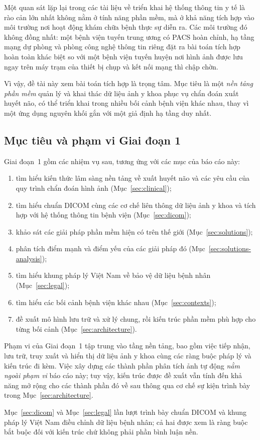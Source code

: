 Một quan sát lặp lại trong các tài liệu về triển khai hệ thống thông tin y tế là
rào cản lớn nhất không nằm ở tính năng phần mềm, mà ở khả năng tích hợp vào môi
trường nơi hoạt động khám chữa bệnh thực sự diễn ra. Các môi trường đó không đồng
nhất: một bệnh viện tuyến trung ương có PACS hoàn chỉnh, hạ tầng mạng dự phòng
và phòng công nghệ thông tin riêng đặt ra bài toán tích hợp hoàn toàn khác biệt so
với một bệnh viện tuyến huyện nơi hình ảnh được lưu ngay trên máy trạm của thiết
bị chụp và kết nối mạng thì chập chờn.

Vì vậy, đề tài này xem bài toán tích hợp là trọng tâm. Mục tiêu là một
\emph{nền tảng phần mềm} quản lý và khai thác dữ liệu ảnh y khoa phục vụ chẩn
đoán xuất huyết não, có thể triển khai trong nhiều bối cảnh bệnh viện khác nhau,
thay vì một ứng dụng nguyên khối gắn với một giả định hạ tầng duy nhất.

\subsection{Mục tiêu và phạm vi Giai đoạn 1}

Giai đoạn~1 gồm các nhiệm vụ sau, tương ứng với các mục của báo cáo này:

\begin{enumerate}[label=(\alph*)]
    \item tìm hiểu kiến thức lâm sàng nền tảng về xuất huyết não và các yêu cầu
          của quy trình chẩn đoán hình ảnh (Mục~\ref{sec:clinical});
    \item tìm hiểu chuẩn DICOM cùng các cơ chế liên thông dữ liệu ảnh y khoa
      và tích hợp với hệ thống thông tin bệnh viện
          (Mục~\ref{sec:dicom});
    \item khảo sát các giải pháp phần mềm hiện có trên thế giới
          (Mục~\ref{sec:solutions});
    \item phân tích điểm mạnh và điểm yếu của các giải pháp đó
          (Mục~\ref{sec:solutions-analysis});
    \item tìm hiểu khung pháp lý Việt Nam về bảo vệ dữ liệu bệnh nhân
          (Mục~\ref{sec:legal});
    \item tìm hiểu các bối cảnh bệnh viện khác nhau
          (Mục~\ref{sec:contexts});
    \item đề xuất mô hình lưu trữ và xử lý chung, rồi kiến trúc phần mềm phù hợp
      cho từng bối cảnh
          (Mục~\ref{sec:architecture}).
\end{enumerate}

Phạm vi của Giai đoạn~1 tập trung vào tầng nền tảng, bao gồm việc tiếp nhận, lưu
trữ, truy xuất và hiển thị dữ liệu ảnh y khoa cùng các ràng buộc pháp lý và kiến
trúc đi kèm. Việc xây dựng các thành phần phân tích ảnh tự động \emph{nằm ngoài
phạm vi} báo cáo này; tuy vậy, kiến trúc được đề xuất vẫn tính đến khả năng mở
rộng cho các thành phần đó về sau thông qua cơ chế sự kiện trình bày trong
Mục~\ref{sec:architecture}.

Mục~\ref{sec:dicom} và Mục~\ref{sec:legal} lần lượt trình bày chuẩn DICOM và
khung pháp lý Việt Nam điều chỉnh dữ liệu bệnh nhân; cả hai được xem là ràng
buộc bắt buộc đối với kiến trúc chứ không phải phần bình luận nền.
